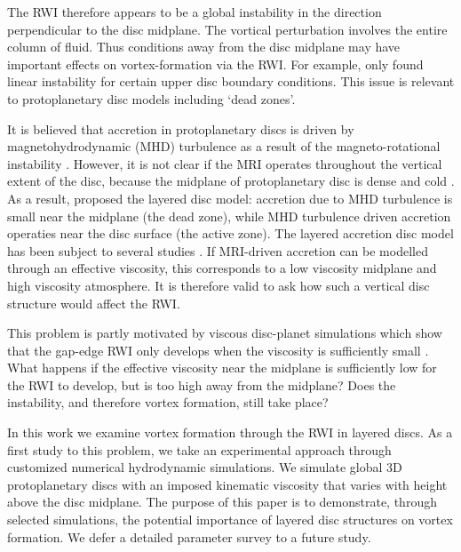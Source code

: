 \documentclass[useAMS,usenatbib]{mn2e}
\begin{document}
The RWI therefore appears to be a global instability in the direction
perpendicular to the disc midplane. The vortical perturbation involves
the entire column of fluid. Thus conditions away
from the disc midplane may have important effects on vortex-formation
via the RWI. For example, \cite{lin13a} only found linear
instability for certain upper disc boundary conditions. This issue is
relevant to protoplanetary disc models including `dead zones'.   

It is believed that accretion in protoplanetary discs is driven by
magnetohydrodynamic (MHD) turbulence as a result of the magneto-rotational instability
\citep[MRI,][]{balbus91}. However, it is not clear if the MRI operates
throughout the vertical extent of the disc, because the midplane of protoplanetary
disc is dense and cold \citep{armitage11}. As a result, \cite{gammie96}
proposed the layered disc model: accretion due to MHD turbulence
is small near the midplane (the dead zone), while MHD turbulence driven accretion
operaties near the disc surface (the active zone). The layered
accretion disc model has been subject to several studies
\citep[e.g.,][]{fleming03,terquem08,oishi09,okuzumi11}.  
If MRI-driven accretion can be modelled through an effective 
viscosity, this corresponds to a low viscosity midplane and 
high viscosity atmosphere. It is therefore valid to ask how such a
vertical disc structure would affect the RWI. 

This problem is partly motivated by viscous disc-planet
simulations which show that the gap-edge RWI only develops when the viscosity is
sufficiently small \citep{valborro06,valborro07,edgar08}.%
What happens if the effective 
viscosity near the midplane is sufficiently low for the RWI to
develop, but is too high away from the midplane? Does the
instability, and therefore vortex formation, still take place? 

In this work we examine vortex formation through the RWI in
layered discs. As a first study to this problem, we take an
experimental approach through customized numerical hydrodynamic
simulations. We simulate global 3D protoplanetary discs with an imposed
kinematic viscosity that varies with height above the disc
midplane. %
The purpose of this paper is to demonstrate, through selected
simulations, the potential importance of layered disc structures on
vortex formation. We defer a detailed parameter survey to a future
study. 
\end{document}
